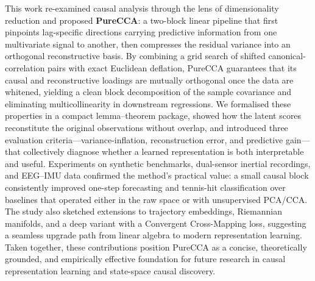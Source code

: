 \documentclass[14pt]{extarticle}
\begin{document}
	This work re-examined causal analysis through the lens of dimensionality reduction and proposed \textbf{PureCCA}: a two-block linear pipeline that first pinpoints lag-specific directions carrying predictive information from one multivariate signal to another, then compresses the residual variance into an orthogonal reconstructive basis.  
	By combining a grid search of shifted canonical-correlation pairs with exact Euclidean deflation, PureCCA guarantees that its causal and reconstructive loadings are mutually orthogonal once the data are whitened, yielding a clean block decomposition of the sample covariance and eliminating multicollinearity in downstream regressions.  
	We formalised these properties in a compact lemma–theorem package, showed how the latent scores reconstitute the original observations without overlap, and introduced three evaluation criteria—variance-inflation, reconstruction error, and predictive gain—that collectively diagnose whether a learned representation is both interpretable and useful.  
	Experiments on synthetic benchmarks, dual-sensor inertial recordings, and EEG–IMU data confirmed the method’s practical value: a small causal block consistently improved one-step forecasting and tennis-hit classification over baselines that operated either in the raw space or with unsupervised PCA/CCA.  
	The study also sketched extensions to trajectory embeddings, Riemannian manifolds, and a deep variant with a Convergent Cross-Mapping loss, suggesting a seamless upgrade path from linear algebra to modern representation learning.  
	Taken together, these contributions position PureCCA as a concise, theoretically grounded, and empirically effective foundation for future research in causal representation learning and state-space causal discovery.

	
	
	
	
\end{document}
